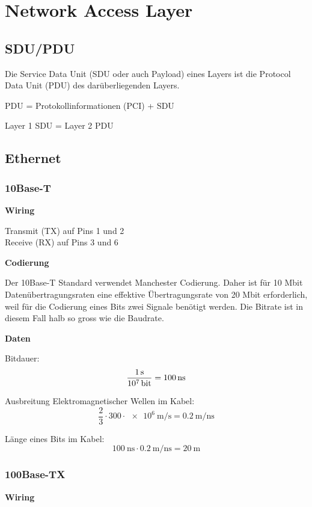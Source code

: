 \section{Network Access Layer}


\subsection{SDU/PDU}

Die Service Data Unit (SDU oder auch Payload) eines Layers ist die Protocol Data
Unit (PDU) des darüberliegenden Layers.

PDU = Protokollinformationen (PCI) + SDU

Layer 1 SDU = Layer 2 PDU


\subsection{Ethernet}
\subsubsection{10Base-T}

\textbf{Wiring}

Transmit (TX) auf Pins 1 und 2\\
Receive (RX) auf Pins 3 und 6

\textbf{Codierung}

Der 10Base-T Standard verwendet Manchester Codierung. Daher ist für 10 Mbit
Datenübertragungsraten eine effektive Übertragungsrate von 20 Mbit erforderlich,
weil für die Codierung eines Bits zwei Signale benötigt werden. Die Bitrate ist
in diesem Fall halb so gross wie die Baudrate.

\textbf{Daten}

Bitdauer:
\[
	\frac{\SI{1}{\second}}{\SI{e7}{\bit}} = \SI{100}{\ns}
\]

Ausbreitung Elektromagnetischer Wellen im Kabel: 
\[
	\frac{2}{3} \cdot 300\cdot \SI{e6}{\meter\per\second} = \SI{0.2}{\meter\per\ns}
\]

Länge eines Bits im Kabel:
\[
	\SI{100}{\ns} \cdot \SI{0.2}{\meter\per\ns} = \SI{20}{\meter}
\]


\subsubsection{100Base-TX}

\textbf{Wiring}

